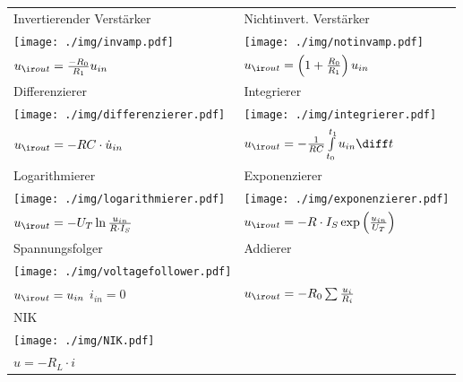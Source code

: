 \documentclass[fs, footer]{latex4ei}
\begin{document}
\begin{multicols*}{4}


		\begin{tabular}{ll}
			Invertierender Verstärker & Nichtinvert. Verstärker \\
			\texttt{[image: ./img/invamp.pdf]} & \texttt{[image: ./img/notinvamp.pdf]} \\
			$u_{\ir out} = \frac{-R_0}{R_1} u_{in}$ & $u_{\ir out} = \left( 1+ \frac{R_0}{R_1} \right) u_{in}$ \\[0.5em] \mrule
			Differenzierer & Integrierer \\
			\texttt{[image: ./img/differenzierer.pdf]} & \texttt{[image: ./img/integrierer.pdf]}\\
			$u_{\ir out} = -RC \cdot \dot u_{in}$ & $u_{\ir out} = -\frac{1}{RC} \int\limits^{t_1}_{t_0} u_{in} \diff t$\\ \mrule
			Logarithmierer & Exponenzierer \\
			\texttt{[image: ./img/logarithmierer.pdf]} & \texttt{[image: ./img/exponenzierer.pdf]}\\
			$u_{\ir out} = -U_T \ln \frac{u_{in}}{R \cdot I_S}$ & $u_{\ir out} = -R \cdot I_S \exp \left( \frac{u_{in}}{U_T} \right)$\\ \mrule
			Spannungsfolger & Addierer\\
		\texttt{[image: ./img/voltagefollower.pdf]} & \\
		$u_{\ir out} = u_{in}$ \quad $i_{in} = 0$ & $u_{\ir out} = -R_0 \sum \frac{u_i}{R_i}$\\ \mrule
		NIK & \\
		\texttt{[image: ./img/NIK.pdf]} & \\
		$u = -R_L \cdot i$ \\


\end{tabular}
\end{multicols*}
\end{document}
